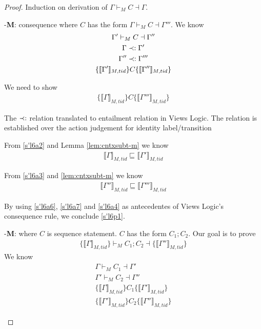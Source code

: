 \begin{proof}
  Induction on derivation of $\Gamma \vdash_{M} C \dashv \Gamma$.

  \begin{case}-\textbf{M}: consequence where $C$ has the form $\Gamma \vdash_{M} C \dashv \Gamma'''$.
    We know
    \begin{gather}\label{s'l6a1}
      \Gamma' \vdash_{M}  C \dashv \Gamma'' \\
      \label{s'l6a2}
      \Gamma \prec: \Gamma'\\
      \label{s'l6a3}
      \Gamma'' \prec: \Gamma''' \\
      \label{s'l6a4}
      \{\llbracket \Gamma' \rrbracket_{M,tid} \}C\{\llbracket \Gamma'' \rrbracket_{M,tid} \}
    \end{gather}

    We need to show
    \begin{gather}\label{s'l6p1}
\{ \llbracket \Gamma \rrbracket_{M,tid} \}C\{\llbracket \Gamma''' \rrbracket_{M,tid}\}
    \end{gather}

    The $\prec:$ relation translated to entailment relation in Views Logic. The relation is established over the action judgement for identity label/transition
    
From \ref{s'l6a2} and Lemma \ref{lem:cntxsubt-m} we know 
\begin{gather}\label{s'l6a6}
\llbracket \Gamma \rrbracket_{M,tid} \sqsubseteq \llbracket \Gamma' \rrbracket_{M,tid}
\end{gather}


From \ref{s'l6a3} and \ref{lem:cntxsubt-m} we know 
\begin{gather}\label{s'l6a7}
\llbracket \Gamma'' \rrbracket_{M,tid} \sqsubseteq \llbracket \Gamma''' \rrbracket_{M,tid}
\end{gather}

By using \ref{s'l6a6}, \ref{s'l6a7} and \ref{s'l6a4} as antecedentes of Views Logic's consequence rule, we conclude \ref{s'l6p1}.
  \end{case}
  
  \begin{case}-\textbf{M}: where $C$ is sequence statement. $C$ has the form $C_1;C_2$. Our goal is to prove
  \begin{gather}
    \label{sl1p1}
   \{ \llbracket \Gamma \rrbracket_{M,tid} \} \vdash_{M} C_1;C_2 \dashv \{ \llbracket \Gamma'' \rrbracket_{M,tid} \}
 \end{gather}
We know 
  \begin{gather}\label{sl1a1}
    \Gamma \vdash_{M} C_1 \dashv \Gamma' \\
    \label{sl1a2}
    \Gamma' \vdash_{M} C_2 \dashv \Gamma''\\
    \label{sl1a3}
    \{\llbracket \Gamma \rrbracket_{M,tid}\}   C_1  \{ \llbracket \Gamma' \rrbracket_{M,tid}\} \\
    \label{sl1a4}
    \{ \llbracket \Gamma' \rrbracket_{M,tid} \}  C_2  \{\llbracket \Gamma'' \rrbracket_{M,tid}\} 
  \end{gather} 
  

\end{case}
\end{proof}
